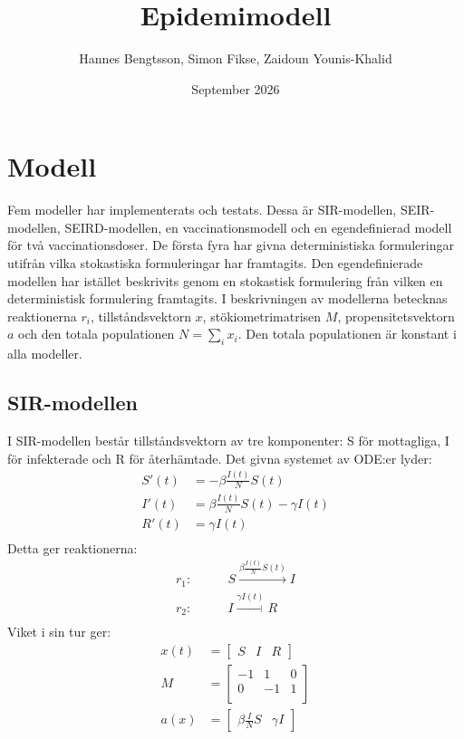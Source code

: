 \documentclass[11pt,a4paper]{article}
\title{Epidemimodell}
\author{Hannes Bengtsson, Simon Fikse, Zaidoun Younis-Khalid}
\date{September 2026}
\begin{document}
\maketitle
\tableofcontents
\newpage

\section{Modell}
Fem modeller har implementerats och testats. Dessa är SIR-modellen, SEIR-modellen, SEIRD-modellen, en vaccinationsmodell och en egendefinierad modell för två vaccinationsdoser. De första fyra har givna deterministiska formuleringar utifrån vilka stokastiska formuleringar har framtagits. Den egendefinierade modellen har istället beskrivits genom en stokastisk formulering från vilken en deterministisk formulering framtagits. I beskrivningen av modellerna betecknas reaktionerna \(r_i\), tillståndsvektorn \(x\), stökiometri\-matrisen \(M\), propensitetsvektorn \(a\) och den totala populationen \(N = \sum_i x_i\). Den totala populationen är konstant i alla modeller.

\subsection{SIR-modellen}
I SIR-modellen består tillståndsvektorn av tre komponenter: S för mottagliga, I för infekterade och R för återhämtade.
Det givna systemet av ODE:er lyder:
\begin{align*}
    S'(t) & = -\beta \frac{I(t)}{N} S(t)              \\
    I'(t) & = \beta \frac{I(t)}{N} S(t) - \gamma I(t) \\
    R'(t) & = \gamma I(t)                             \\
\end{align*}
Detta ger reaktionerna:
\begin{align*}
    r_1: \qquad & S \xrightarrow{\beta \frac{I(t)}{N} S(t)} I \\
    r_2: \qquad & I \xrightarrow{\gamma I(t)} R               \\
\end{align*}
Viket i sin tur ger:
\begin{align*}
    x(t) & = \begin{bmatrix} S & I & R \end{bmatrix}                      \\
    M    & = \begin{bmatrix}
                 -1 & 1  & 0 \\
                 0  & -1 & 1 \\
             \end{bmatrix}                                               \\
    a(x) & = \begin{bmatrix} \beta \frac{I}{N} S & \gamma I \end{bmatrix} \\
\end{align*}
\end{document}

